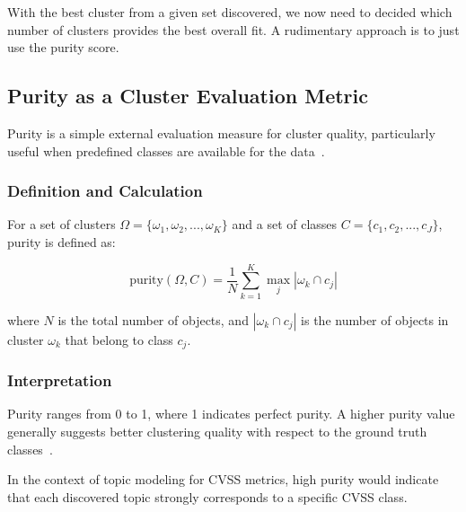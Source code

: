With the best cluster from a given set discovered, we now need to decided which number of clusters provides the best overall fit. A rudimentary approach is to just use the purity score.

\subsection{Purity as a Cluster Evaluation Metric}\label{sec:purity}

Purity is a simple external evaluation measure for cluster quality, particularly useful when predefined classes are available for the data~\cite{purity_usuage}.

\subsubsection{Definition and Calculation}

For a set of clusters $\Omega = \{\omega_1, \omega_2, ..., \omega_K\}$ and a set of classes $C = \{c_1, c_2, ..., c_J\}$, purity is defined as:

\begin{equation}
	\text{purity}(\Omega, C) = \frac{1}{N} \sum_{k=1}^K \max_j |\omega_k \cap c_j|
\end{equation}

where $N$ is the total number of objects, and $|\omega_k \cap c_j|$ is the number of objects in cluster $\omega_k$ that belong to class $c_j$.

\subsubsection{Interpretation}

Purity ranges from 0 to 1, where 1 indicates perfect purity. A higher purity value generally suggests better clustering quality with respect to the ground truth classes~\cite{purity_info_ret}.

In the context of topic modeling for CVSS metrics, high purity would indicate that each discovered topic strongly corresponds to a specific CVSS class.


